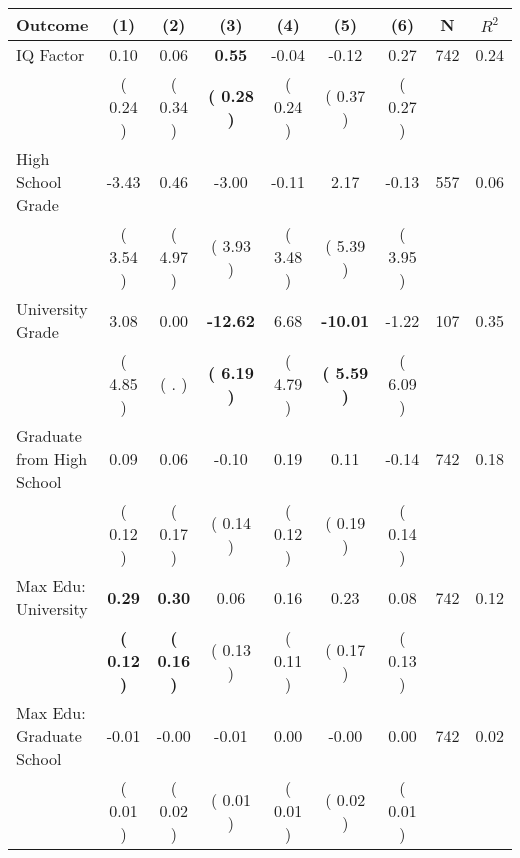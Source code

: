 \begin{tabular}{lcccccccc}
\toprule
 \textbf{Outcome} & \textbf{(1)} & \textbf{(2)} & \textbf{(3)} & \textbf{(4)} & \textbf{(5)} & \textbf{(6)} & \textbf{N} & \textbf{$ R^2$} \\
\midrule
IQ Factor &      0.10 &      0.06 & \textbf{     0.55} &     -0.04 &     -0.12 &      0.27 & 742 &       0.24 \\ 
 & (     0.24 ) & (     0.34 ) & \textbf{(     0.28 )} & (     0.24 ) & (     0.37 ) & (     0.27 ) & \\
High School Grade &     -3.43 &      0.46 &     -3.00 &     -0.11 &      2.17 &     -0.13 & 557 &       0.06 \\ 
 & (     3.54 ) & (     4.97 ) & (     3.93 ) & (     3.48 ) & (     5.39 ) & (     3.95 ) & \\
University Grade &      3.08 &      0.00 & \textbf{   -12.62} &      6.68 & \textbf{   -10.01} &     -1.22 & 107 &       0.35 \\ 
 & (     4.85 ) & (        . ) & \textbf{(     6.19 )} & (     4.79 ) & \textbf{(     5.59 )} & (     6.09 ) & \\
Graduate from High School &      0.09 &      0.06 &     -0.10 &      0.19 &      0.11 &     -0.14 & 742 &       0.18 \\ 
 & (     0.12 ) & (     0.17 ) & (     0.14 ) & (     0.12 ) & (     0.19 ) & (     0.14 ) & \\
Max Edu: University & \textbf{     0.29} & \textbf{     0.30} &      0.06 &      0.16 &      0.23 &      0.08 & 742 &       0.12 \\ 
 & \textbf{(     0.12 )} & \textbf{(     0.16 )} & (     0.13 ) & (     0.11 ) & (     0.17 ) & (     0.13 ) & \\
Max Edu: Graduate School &     -0.01 &     -0.00 &     -0.01 &      0.00 &     -0.00 &      0.00 & 742 &       0.02 \\ 
 & (     0.01 ) & (     0.02 ) & (     0.01 ) & (     0.01 ) & (     0.02 ) & (     0.01 ) & \\
\bottomrule
\end{tabular}
